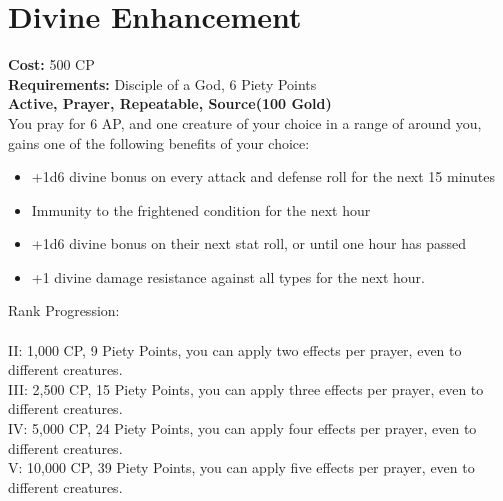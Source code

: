 \section{Divine Enhancement}\label{prayer:divineEnhancement}
\textbf{Cost:} 500 CP\\
\textbf{Requirements:} Disciple of a God, 6 Piety Points \\
\textbf{Active, Prayer, Repeatable, Source(100 Gold)}\\
You pray for 6 AP, and one creature of your choice in a range of  around you, gains one of the following benefits of your choice:
\begin{itemize}
	\item +1d6 divine bonus on every attack and defense roll for the next 15 minutes
	\item Immunity to the frightened condition for the next hour
	\item +1d6 divine bonus on their next stat roll, or until one hour has passed
	\item +1 divine damage resistance against all types for the next hour.
\end{itemize}

Rank Progression:\\
\\
II: 1,000 CP, 9 Piety Points, you can apply two effects per prayer, even to different creatures.\\
III: 2,500 CP, 15 Piety Points, you can apply three effects per prayer, even to different creatures.\\
IV: 5,000 CP, 24 Piety Points, you can apply four effects per prayer, even to different creatures.\\
V: 10,000 CP, 39 Piety Points, you can apply five effects per prayer, even to different creatures.\\